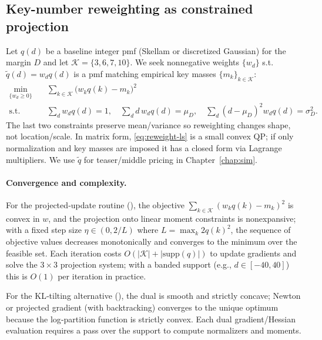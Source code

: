 \subsection{Key-number reweighting as constrained projection}\label{subsec:key-reweight}
Let $q(d)$ be a baseline integer pmf (Skellam or discretized Gaussian) for the margin $D$ and let
$\mathcal{K}=\{3,6,7,10\}$. We seek nonnegative weights $\{w_d\}$ s.t. $\tilde q(d)=w_d q(d)$ is a
pmf matching empirical key masses $\{m_k\}_{k\in\mathcal{K}}$:
\begin{align}\label{eq:reweight-ls}
\min_{\{w_d\ge0\}} \quad & \sum_{k\in\mathcal{K}} \big(w_k q(k)-m_k\big)^2 \\
\text{s.t.}\quad &
\sum_{d} w_d q(d)=1,\quad
\sum_d d\,w_d q(d)=\mu_D,\quad
\sum_d (d-\mu_D)^2 w_d q(d)=\sigma_D^2. \nonumber
\end{align}
The last two constraints preserve mean/variance so reweighting changes shape, not location/scale.
In matrix form, \eqref{eq:reweight-ls} is a small convex QP; if only normalization and key masses
are imposed it has a closed form via Lagrange multipliers. We use $\tilde q$ for teaser/middle pricing in Chapter~\ref{chap:sim}.

\paragraph{Convergence and complexity.} For the projected‑update routine (), the objective $\sum_{k\in\mathcal K}(w_k q(k)-m_k)^2$ is convex in $w$, and the projection onto linear moment constraints is nonexpansive; with a fixed step size $\eta\in(0,2/L)$ where $L=\max_k 2 q(k)^2$, the sequence of objective values decreases monotonically and converges to the minimum over the feasible set. Each iteration costs $O(|\mathcal K|+|\mathrm{supp}(q)|)$ to update gradients and solve the $3\times3$ projection system; with a banded support (e.g., $d\in[-40,40]$) this is $O(1)$ per iteration in practice.

For the KL‑tilting alternative (), the dual is smooth and strictly concave; Newton or projected gradient (with backtracking) converges to the unique optimum because the log‑partition function is strictly convex. Each dual gradient/Hessian evaluation requires a pass over the support to compute normalizers and moments.

